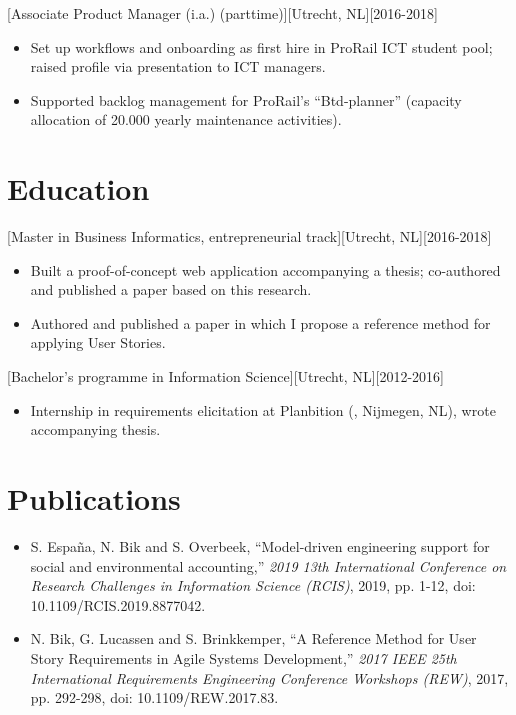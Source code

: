 \documentclass[10pt]{article}
\begin{document}
[Associate Product Manager (i.a.) (parttime)][Utrecht, NL][2016-2018]
\begin{itemize}
    \item Set up workflows and onboarding as first hire in ProRail ICT student pool; raised profile via presentation to ICT managers.
    \item Supported backlog management for ProRail's \enquote{Btd-planner} (capacity allocation of 20.000 yearly maintenance activities).
\end{itemize}

\section{Education}
\label{sec:school}

[Master in Business Informatics, entrepreneurial track][Utrecht, NL][2016-2018]
\begin{itemize}
    \item Built a proof-of-concept web application accompanying a thesis; co-authored and published a paper based on this research.
    \item Authored and published a paper in which I propose a reference method for applying User Stories.
\end{itemize}

[Bachelor's programme in Information Science][Utrecht, NL][2012-2016]
\begin{itemize}
    \item Internship in requirements elicitation at Planbition (, Nijmegen, NL), wrote accompanying thesis.
\end{itemize}

\section{Publications}
\label{sec:pubs}

\begin{itemize}
    \item S. España, N. Bik and S. Overbeek, \enquote{Model-driven engineering support for social and environmental accounting,} \textit{2019 13th International Conference on Research Challenges in Information Science (RCIS)}, 2019, pp. 1-12, doi:\\ 10.1109/RCIS.2019.8877042.
    \item N. Bik, G. Lucassen and S. Brinkkemper, \enquote{A Reference Method for User Story Requirements in Agile Systems Development,} \textit{2017 IEEE 25th International Requirements Engineering Conference Workshops (REW)}, 2017, pp. 292-298, doi: 10.1109/REW.2017.83.
\end{itemize}
\end{document}

